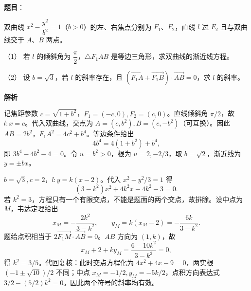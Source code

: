 \begin{answer}

\textbf{题目}：

双曲线 \(x^2-\dfrac{y^2}{b^2}=1\)（\(b>0\)）的左、右焦点分别为 \(F_1\)、\(F_2\)，直线 \(l\) 过 \(F_2\) 且与双曲线交于 \(A\)、\(B\) 两点。

（1） 若 \(l\) 的倾斜角为 \(\dfrac{\pi}{2}\)，\(\triangle F_1AB\) 是等边三角形，求双曲线的渐近线方程。

（2） 设 \(b=\sqrt{3}\)，若 \(l\) 的斜率存在，且 \(\left(\overrightarrow{F_1A}+\overrightarrow{F_1B}\right)\cdot\overrightarrow{AB}=0\)，求 \(l\) 的斜率。

\textbf{解析}


记焦距参数 \(c=\sqrt{1+b^2}\)，\(F_1=(-c,0),F_2=(c,0)\)。直线倾斜角 \(\pi/2\)，故 \(l:x=c\)。代入双曲线，交点为 \(A=(c,b^2),B=(c,-b^2)\)（可互换）。因此 \(AB=2b^2\)，\(F_1A^2=4c^2+b^4\)。等边条件给出
\nopagebreak[4]
\[
4b^4=4(1+b^2)+b^4,
\]
即 \(3b^4-4b^2-4=0\)。令 \(u=b^2>0\)，根为 \(u=2,-2/3\)，取 \(b=\sqrt2\)，渐近线为 \(y=\pm bx\)。

\(b=\sqrt3,c=2\)，\(l:y=k(x-2)\)。代入 \(x^2-y^2/3=1\) 得
\nopagebreak[4]
\[
(3-k^2)x^2+4k^2x-4k^2-3=0.
\]
若 \(k^2=3\)，方程只有一个有限交点，不能是题面的两个交点，故排除。设中点为 \(M\)，韦达定理给出
\nopagebreak[4]
\[
x_M=-\frac{2k^2}{3-k^2},\qquad y_M=k(x_M-2)=-\frac{6k}{3-k^2}.
\]
题给点积相当于 \(2\overrightarrow{F_1M}\cdot\overrightarrow{AB}=0\)。\(AB\) 方向为 \((1,k)\)，故
\nopagebreak[4]
\[
x_M+2+ky_M=\frac{6-10k^2}{3-k^2}=0,
\]
得 \(k^2=3/5\)。代回复核：此时交点方程化为 \(4x^2+4x-9=0\)，两实根 \((-1\pm\sqrt{10})/2\) 不同；中点 \(x_M=-1/2,y_M=-5k/2\)，点积方向表达式 \(3/2-(5/2)k^2=0\)。因此两个符号的斜率均有效。



\end{answer}

